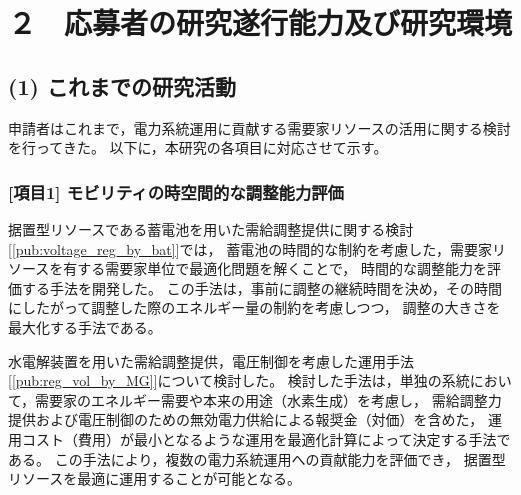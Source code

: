 \documentclass[11pt,a4paper,uplatex,dvipdfmx]{ujarticle} 		%
\newcommand{\研究課題名}{モビリティの時空間調整を活用した電力設備形成構築}
\newcommand{\研究機関名}{名古屋工業大学}
\newcommand{\研究代表者氏名}{中村勇太}
\newcommand{\研究期間の最終元号年度}{10}  %
\begin{document}




\section{２　応募者の研究遂行能力及び研究環境}


\vspace{-2\baselineskip}           %
\subsection*{(1) これまでの研究活動}
\vspace{-0.5\baselineskip}           %

	申請者はこれまで，電力系統運用に貢献する需要家リソースの活用に関する検討を行ってきた。
	以下に，本研究の各項目に対応させて示す。

	\vspace{-1.5\baselineskip}           %
	\subsubsection*{\textbf{[項目1]} モビリティの時空間的な調整能力評価}
	\vspace{-0.5\baselineskip}           %

	据置型リソースである蓄電池を用いた需給調整提供に関する検討[\ref{pub:voltage_reg_by_bat}]では，
	蓄電池の時間的な制約を考慮した，需要家リソースを有する需要家単位で最適化問題を解くことで，
	時間的な調整能力を評価する手法を開発した。
	この手法は，事前に調整の継続時間を決め，その時間にしたがって調整した際のエネルギー量の制約を考慮しつつ，
	調整の大きさを最大化する手法である。	

	水電解装置を用いた需給調整提供，電圧制御を考慮した運用手法[\ref{pub:reg_vol_by_MG}]について検討した。
	検討した手法は，単独の系統において，需要家のエネルギー需要や本来の用途（水素生成）を考慮し，
	需給調整力提供および電圧制御のための無効電力供給による報奨金（対価）を含めた，
	運用コスト（費用）が最小となるような運用を最適化計算によって決定する手法である。
	この手法により，複数の電力系統運用への貢献能力を評価でき，
	据置型リソースを最適に運用することが可能となる。	
\end{document}
